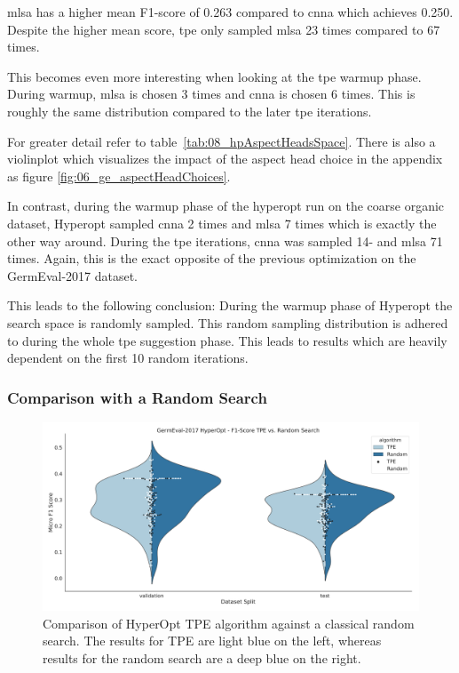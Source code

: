 \gls{mlsa} has a higher mean F1-score of 0.263 compared to \gls{cnna} which achieves 0.250. Despite the higher mean score, \gls{tpe} only sampled \gls{mlsa} 23 times compared to 67 times.

This becomes even more interesting when looking at the \gls{tpe} warmup phase. During warmup, \gls{mlsa} is chosen 3 times and \gls{cnna} is chosen 6 times. This is roughly the same distribution compared to the later \gls{tpe} iterations. 

For greater detail refer to table~\ref{tab:08_hpAspectHeadsSpace}. There is also a violinplot which visualizes the impact of the aspect head choice in the appendix as figure \ref{fig:06_ge_aspectHeadChoices}.
\medskip

In contrast, during the warmup phase of the hyperopt run on the coarse organic dataset, Hyperopt sampled \gls{cnna} 2 times and \gls{mlsa} 7 times which is exactly the other way around. During the \gls{tpe} iterations, \gls{cnna} was sampled 14- and \gls{mlsa} 71 times. Again, this is the exact opposite of the previous optimization on the GermEval-2017 dataset.
\medskip

This leads to the following conclusion: During the warmup phase of Hyperopt the search space is randomly sampled. This random sampling distribution is adhered to during the whole \gls{tpe} suggestion phase. This leads to results which are heavily dependent on the first 10 random iterations.

\subsubsection*{Comparison with a Random Search}

\begin{figure}[ht]
	\centering
	\includegraphics[width=\textwidth]{figures/06_results/06_hp_ge_vio_tpeRand}
	\caption{Comparison of HyperOpt TPE algorithm against a classical random search. The results for TPE are light blue on the left, whereas results for the random search are a deep blue on the right.}
	\label{fig:06_HpOptimTpe_Rand}
\end{figure}

